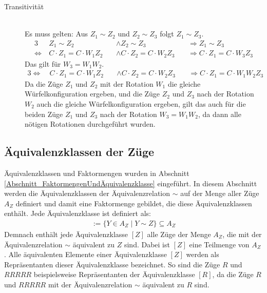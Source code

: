 \documentclass[12pt,a4paper, usenames, dvipsnames]{article}
\theoremstyle{mystyle}
\theoremstyle{definition}
\begin{document}
\begin{description}
\item [Transitivität] \ \\
Es muss gelten: Aus $Z_1 \sim Z_2$ und $Z_2 \sim Z_3$ folgt $Z_1 \sim Z_3$.
\begin{alignat*}{3}
& Z_1 \sim Z_2 && \wedge Z_2 \sim Z_3 && \Rightarrow Z_1 \sim Z_3 \\
\Leftrightarrow \ & C \cdot  Z_1 = C \cdot  W_1Z_2 \ && \wedge C \cdot  Z_2 = C \cdot  W_2Z_3 \ && \Rightarrow C \cdot  Z_1 = C \cdot  W_3Z_3
\end{alignat*}
Das gilt für $W_3=W_1W_2$.
\begin{alignat*}{3}
\Leftrightarrow \ & C \cdot  Z_1 = C \cdot  W_1Z_2 \ && \wedge C \cdot  Z_2 = C \cdot W_2Z_3 \ && \Rightarrow C \cdot  Z_1 = C \cdot W_1W_2Z_3 
\end{alignat*}
Da die Züge $Z_1$ und $Z_2$ mit der Rotation $W_1$ die gleiche Würfelkonfiguration ergeben, und die Züge $Z_2$ und $Z_3$ nach der Rotation $W_2$ auch die gleiche Würfelkonfiguration ergeben, gilt das auch für die beiden Züge $Z_1$ und $Z_3$ nach der Rotation $W_3=W_1W_2$, da dann alle nötigen Rotationen durchgeführt wurden.

\end{description}




%
%
%
%
%
%
%
%
%
%
%
%
%
%
%
%
%
%
%
%


\subsection{Äquivalenzklassen der Züge} 

\label{Abschnitt_ÄquivalenzklassenDerZüge}

Äquivalenzklassen und Faktormengen wurden in Abschnitt \ref{Abschnitt_FaktormengenUndÄquivalenzklasse} eingeführt. In diesem Abschnitt werden die Äquivalenzklassen der Äquivalenzrelation $\sim$ auf der Menge aller Züge $A_Z$ definiert und damit eine Faktormenge gebildet, die diese Äquivalenzklassen enthält. Jede Äquivalenzklasse ist definiert als:
\begin{align*}
[Z] := \{ Y \in A_Z \mid Y \sim Z \} \subseteq A_Z
\end{align*}
Demnach enthält jede Äquivalenzklasse $[Z]$ alle Züge der Menge $A_Z$, die mit der Äquivalenzrelation $\sim$ äquivalent zu $Z$ sind. Dabei ist $[Z]$ eine Teilmenge von $A_Z$.  Alle äquivalenten Elemente einer Äquivalenzklasse $[Z]$ werden als Repräsentanten dieser Äquivalenzklasse bezeichnet. So sind die Züge $R$ und $RRRRR$ beispielsweise Repräsentanten der Äquivalenzklasse $[R]$, da die Züge $R$ und $RRRRR$ mit der Äquivalenzrelation $\sim$ äquivalent zu $R$ sind.
\end{document}
